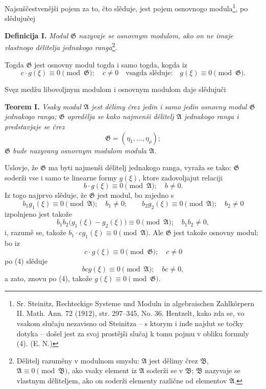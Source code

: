 \documentclass[11pt]{article}
\providecommand{\Amod}{\mathfrak A}
\providecommand{\Bmod}{\mathfrak B}
\providecommand{\Gmod}{\mathfrak G}
\providecommand{\zero}[1]{\equiv 0\pmod{#1}}
\begin{document}
Najsuščestvenějši pojem za to, čto slěduje, jest pojem osnovnogo modula\footnote{Sr. Steinitz, Rechteckige Systeme und Moduln in algebraischen Zahlkörpern II. Math. Ann. 72 (1912), str. 297--345, No. 36. Hentzelt, kako zda se, vo vsakom slučaju nezavisno od Steinitza -- s ktorym i inđe najdut se točky dotyka -- došel jest za svoj prostějši slučaj k tomu pojmu v obliku formuly (4). (E. N.)}, po slědujučej

\medskip
\noindent\textbf{Definicija I.} \emph{Modul $\Gmod$ nazyvaje se osnovnym modulom, ako on ne imaje vlastnogo dělitelja jednakogo ranga}\footnote{Dělitelj razuměny v modulnom smyslu: $\Amod$ jest dělimy črez $\Bmod$, $\Amod\zero{\Bmod}$, ako vsaky element iz $\Amod$ soderži se v $\Bmod$; $\Bmod$ nazyvaje se vlastnym děliteljem, ako on soderži elementy različne od elementov $\Amod$.}.

Togda $\Gmod$ jest osnovny modul togda i samo togda, kogda iz
\begin{equation}
 c\cdot g(\xi)\zero{\Gmod};\quad c\ne0 \quad\text{vsagda slěduje:}\quad g(\xi)\zero{\Gmod}.
\tag{2}
\end{equation}

Svęz medžu libovoljnym modulom i osnovnym modulom daje slědujuči

\medskip
\noindent\textbf{Teorem I.} \emph{Vsaky modul $\Amod$ jest dělimy črez jedin i samo jedin osnovny modul $\Gmod$ jednakogo ranga; $\Gmod$ opredělja se kako najmenši dělitelj $\Amod$ jednakogo ranga i predstavjaje se črez}
\begin{equation}
 \Gmod=(\eta_1,\ldots,\eta_\rho);
\tag{3}
\end{equation}
\emph{$\Gmod$ bude nazyvany osnovnym modulom modula $\Amod$.}

Uslovje, že $\Gmod$ ma byti najmenši dělitelj jednakogo ranga, vyraža se tako: $\Gmod$ soderži vse i samo te linearne formy $g(\xi)$, ktore zadovoljajut relaciji
\begin{equation}
 b\cdot g(\xi)\zero{\Amod};\quad b\ne0.
\tag{4}
\end{equation}
Iz togo najprvo slěduje, že $\Gmod$ jest modul, bo zajedno s
\[
 b_1g_1(\xi)\zero{\Amod};\quad b_1\ne0;
 \qquad
 b_2g_2(\xi)\zero{\Amod};\quad b_2\ne0
\]
izpolnjeno jest takože
\[
 b_1b_2\bigl(g_1(\xi)-g_2(\xi)\bigr)\zero{\Amod};\quad b_1b_2\ne0,
\]
i, razumě se, takože $b_1\cdot c g_1(\xi)\zero{\Amod}$. Ale $\Gmod$ jest takože osnovny modul; bo iz
\[
 c\cdot g(\xi)\zero{\Gmod};\quad c\ne0
\]
po (4) slěduje
\[
 b c g(\xi)\zero{\Amod};\quad bc\ne0,
\]
a zato, znovu po (4), takože $g(\xi)\zero{\Gmod}$.
\end{document}
